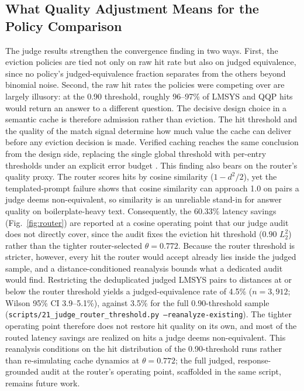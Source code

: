 \documentclass[sigconf,nonacm]{acmart}
\begin{document}
\subsection{What Quality Adjustment Means for the Policy Comparison}
\label{sec:qadj-meaning}
The judge results strengthen the convergence finding in two ways.
First, the eviction policies are tied not only on raw hit rate but
also on judged equivalence, since no policy's judged-equivalence
fraction separates from the others beyond binomial noise. Second, the
raw hit rates the policies were competing over are largely illusory:
at the 0.90 threshold, roughly 96--97\% of LMSYS and QQP hits would
return an answer to a different question. The decisive design choice
in a semantic cache is therefore admission rather than eviction. The
hit threshold and the quality of the match signal determine how much
value the cache can deliver before any eviction decision is made.
Verified caching reaches the same conclusion from the design side,
replacing the single global threshold with per-entry thresholds under an
explicit error budget \cite{schroeder2025vcache}.
This finding also bears on the router's quality proxy. The
router scores hits by cosine similarity ($1 - d^2/2$), yet the
templated-prompt failure shows that cosine similarity can approach 1.0
on pairs a judge deems non-equivalent, so similarity is an unreliable
stand-in for answer quality on boilerplate-heavy text. Consequently, the
60.33\% latency savings (Fig.~\ref{fig:router}) are reported at a cosine
operating point that our judge audit does not directly cover, since the audit
fixes the eviction hit threshold ($0.90$ $L_2^2$) rather than the tighter
router-selected $\theta = 0.772$. Because the router threshold is stricter,
however, every hit the router would accept already lies inside the judged
sample, and a distance-conditioned reanalysis bounds what a dedicated audit
would find. Restricting the deduplicated judged LMSYS pairs to distances at
or below the router threshold yields a judged-equivalence rate of 4.5\%
($n = 3{,}912$; Wilson 95\% CI 3.9--5.1\%), against 3.5\% for the full
0.90-threshold sample
(\texttt{scripts/21\_judge\_router\_threshold.py --reanalyze-existing}).
The tighter operating point therefore does not restore hit quality on its
own, and most of the routed latency savings are realized on hits a judge
deems non-equivalent. This reanalysis conditions on the hit distribution of
the 0.90-threshold runs rather than re-simulating cache dynamics at
$\theta = 0.772$; the full judged, response-grounded audit at the router's
operating point, scaffolded in the same script, remains future work.
\end{document}
